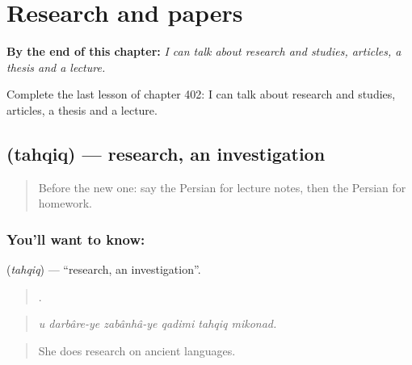 
\chapter{Research and papers}
\label{ch:fa-research-and-papers}

\begin{chapteropening}
\textbf{By the end of this chapter:} \emph{I can talk about research and studies, articles, a thesis and a lecture.}

Complete the last lesson of chapter 402: I can talk about research and studies, articles, a thesis and a lecture.
\end{chapteropening}

\section[\texorpdfstring{\fa{تحقیق} (tahqiq)}{تحقیق (tahqiq)}]{ (tahqiq) — research, an investigation}

\label{lesson:FA-C402-tahqiq}



\begin{quote}
Before the new one: say the Persian for lecture notes, then the Persian for homework.
\end{quote}

\subsection*{You'll want to know: }
\textbf{} (\emph{tahqiq}) — \textquotedblleft{}research, an investigation\textquotedblright{}.

\begin{quote}
     .
\end{quote}

\begin{quote}
\emph{u darbâre-ye zabânhâ-ye qadimi tahqiq mikonad.}
\end{quote}

\begin{quote}
She does research on ancient languages.
\end{quote}

